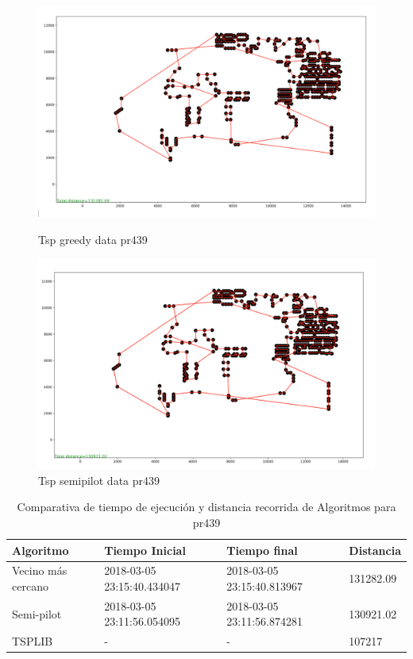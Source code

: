 \documentclass{article}
\begin{document}
\begin{figure}[H]
	\begin{minipage}{0.5\textwidth}
		\centering
		\includegraphics[width=1\textwidth]{../image/greedy/greedy-pr439.png}
		\caption{\label{fig:Figura1} Tsp greedy data pr439}
	\end{minipage}\hfill
	\begin {minipage}{0.5\textwidth}
		\centering
		\includegraphics[width=1\textwidth]{../image/semipilot/semipilot-pr439-2-2.png}
		\caption{\label{fig:Figura1} Tsp semipilot data pr439}
	\end{minipage}
\end{figure}

\begin{table}[H]
\centering
\caption{Comparativa de tiempo de ejecución y distancia recorrida de Algoritmos para pr439}
\label{Table:pr439}
\begin{tabular}{| l | l | l | l |}
\hline
Algoritmo & Tiempo Inicial & Tiempo final & Distancia \\ \hline
Vecino más cercano & 2018-03-05 23:15:40.434047 & 2018-03-05 23:15:40.813967 & 131282.09 \\ \hline
Semi-pilot & 2018-03-05 23:11:56.054095 & 2018-03-05 23:11:56.874281 & 130921.02 \\ \hline
TSPLIB & - & - & 107217 \\ \hline

\end{tabular}
\end{table}
\end{document}
